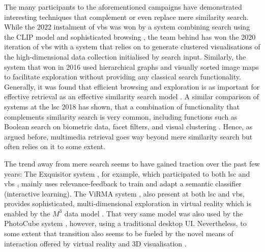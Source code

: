 The many participants to the aforementioned campaigns have demonstrated interesting techniques that complement or even replace mere similarity search. While the 2022 instalment of \acrshort{vbs} was won by a system combining search using the CLIP model \cite{Radford:2021Learning} and sophisticated browsing \cite{Hezel:2022Efficient}, the team behind \cite{Kratochvil:2020SOM} has won the 2020 iteration of \acrshort{vbs} with a system that relies on  \cite{Kohonen:1990Self} to generate clustered visualisations of the high-dimensional data collection initialised by search input. Similarly, the system that won in 2016 \cite{Barthel:2016Navigating} used hierarchical graphs and visually sorted image maps to facilitate exploration without providing any classical search functionality. Generally, it was found that efficient browsing and exploration is as important for effective retrieval as an effective similarity search model \cite{Lokovc:2019Interactive}. A similar comparison of systems at the \acrshort{lsc} 2018 has shown, that a combination of functionality that complements similarity search is very common, including functions such as Boolean search on biometric data, facet filters, and visual clustering \cite{Gurrin:2019Invited}. Hence, as argued before, multimedia retrieval goes way beyond mere similarity search but often relies on it to some extent.

The trend away from mere search seems to have gained traction over the past few years: The Exquisitor system \cite{Ragnarsdottir:2019Exquisitor}, for example, which participated to both \acrshort{lsc} \cite{Khan:2021Exquisitor} and \acrshort{vbs} \cite{Khan:2022Exquisitor}, mainly uses relevance-feedback to train and adapt a semantic classifier (interactive learning). The ViRMA system \cite{Duane:2022ViRMA}, also present at both \acrshort{lsc} and \acrshort{vbs}, provides sophisticated, multi-dimensional exploration in virtual reality which is enabled by the $M^3$ data model \cite{Duane:2021ViRMA}. That very same model was also used by the PhotoCube system \cite{Shin2021:Photocube}, however, using a traditional desktop UI. Nevertheless, to some extent that transition also seems to be fueled by the novel means of interaction offered by virtual reality and 3D visualisation \cite{Spiess:2021Competitive,Spiess:2021Exploring,Spiess:2022Multi}.